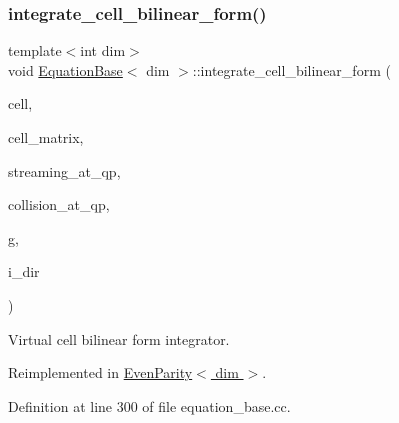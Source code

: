 \subsubsection{\texorpdfstring{integrate\+\_\+cell\+\_\+bilinear\+\_\+form()}{integrate\_cell\_bilinear\_form()}}
{\footnotesize\ttfamily template$<$int dim$>$ \\
void \hyperlink{class_equation_base}{Equation\+Base}$<$ dim $>$\+::integrate\+\_\+cell\+\_\+bilinear\+\_\+form (\begin{DoxyParamCaption}\item[{typename Do\+F\+Handler$<$ dim $>$\+::active\+\_\+cell\+\_\+iterator \&}]{cell,  }\item[{Full\+Matrix$<$ double $>$ \&}]{cell\+\_\+matrix,  }\item[{std\+::vector$<$ std\+::vector$<$ Full\+Matrix$<$ double $>$ $>$ $>$ \&}]{streaming\+\_\+at\+\_\+qp,  }\item[{std\+::vector$<$ Full\+Matrix$<$ double $>$ $>$ \&}]{collision\+\_\+at\+\_\+qp,  }\item[{const unsigned int \&}]{g,  }\item[{const unsigned int \&}]{i\+\_\+dir }\end{DoxyParamCaption})\hspace{0.3cm}{\ttfamily [virtual]}}

Virtual cell bilinear form integrator. 

Reimplemented in \hyperlink{class_even_parity_adb381ea4f45e5ae3741b1d30a0de02b6}{Even\+Parity$<$ dim $>$}.



Definition at line 300 of file equation\+\_\+base.\+cc.

\mbox{\label{class_equation_base_ae8472f5c20d76c7d01e5660f8377887e}} 
